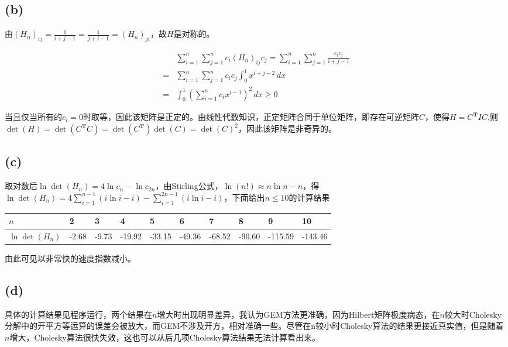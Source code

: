 \documentclass[UTF8]{ctexart}
\begin{document}
\subsection*{(b)}
由$(H_n)_{ij}=\frac{1}{i+j-1}=\frac{1}{j+i-1}=(H_n)_{ji}$，故$H$是对称的。

\begin{equation*}
    \begin{aligned}
        &\sum_{i=1}^{n}\sum_{j=1}^{n}c_i(H_n)_{ij} c_j=\sum_{i=1}^{n}\sum_{j=1}^{n}\frac{c_i c_j}{i+j-1}\\
        =&\sum_{i=1}^{n}\sum_{j=1}^{n}c_i c_j\int_{0}^{1} x^{i+j-2} \,dx \\
        =&\int_{0}^{1}\left(\sum_{i=1}^{n} c_i x^{i-1}\right)^2 \,dx \geq0
    \end{aligned}
\end{equation*}

当且仅当所有的$c_i=0$时取等，因此该矩阵是正定的。由线性代数知识，正定矩阵合同于单位矩阵，即存在可逆矩阵$C$，使得$H=C^\mathbf{T}IC$,则$\det(H)=\det(C^\mathbf{T}C)=\det(C^\mathbf{T})\det(C)=\det(C)^2$，因此该矩阵是非奇异的。

\subsection*{(c)}
取对数后$\ln \det(H_n)=4\ln c_n -\ln c_{2n}$，由Stirling公式，$\ln (n!)\approx n\ln n -n$，得$\ln \det(H_n)=4\sum_{i=1}^{n-1}(i \ln i -i)-\sum_{i=1}^{2n-1}(i \ln i -i)$，下面给出$n\leq10$的计算结果
\begin{table}[hp]
    \centering
    \begin{tabular}{|l|l|l|l|l|l|l|l|l|l|} 
    \hline
    $n$ & 2     & 3     & 4      & 5      & 6      & 7      & 8      & 9       & 10       \\ 
    \hline
    $\ln \det(H_n)$  & -2.68 & -9.73 & -19.92 & -33.15 & -49.36 & -68.52 & -90.60 & -115.59 & -143.46  \\
    \hline
    \end{tabular}
    \end{table}

    由此可见以非常快的速度指数减小。
\subsection*{(d)}
具体的计算结果见程序运行，两个结果在$n$增大时出现明显差异，我认为GEM方法更准确，因为Hilbert矩阵极度病态，在$n$较大时Cholesky分解中的开平方等运算的误差会被放大，而GEM不涉及开方，相对准确一些。尽管在n较小时Cholesky算法的结果更接近真实值，但是随着$n$增大，Cholesky算法很快失效，这也可以从后几项Cholesky算法结果无法计算看出来。
\end{document}
